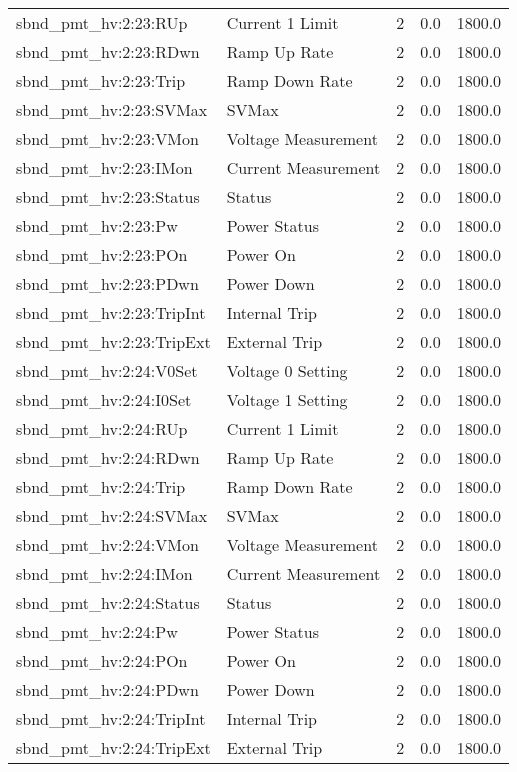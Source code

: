 \begin{center}
\begin{longtable}{l | l l l l }
sbnd\_pmt\_hv:2:23:RUp & Current 1 Limit & 2 & 0.0 & 1800.0\\ 
sbnd\_pmt\_hv:2:23:RDwn & Ramp Up Rate & 2 & 0.0 & 1800.0\\ 
sbnd\_pmt\_hv:2:23:Trip & Ramp Down Rate & 2 & 0.0 & 1800.0\\ 
sbnd\_pmt\_hv:2:23:SVMax & SVMax & 2 & 0.0 & 1800.0\\ 
sbnd\_pmt\_hv:2:23:VMon & Voltage Measurement & 2 & 0.0 & 1800.0\\ 
sbnd\_pmt\_hv:2:23:IMon & Current Measurement & 2 & 0.0 & 1800.0\\ 
sbnd\_pmt\_hv:2:23:Status & Status & 2 & 0.0 & 1800.0\\ 
sbnd\_pmt\_hv:2:23:Pw & Power Status & 2 & 0.0 & 1800.0\\ 
sbnd\_pmt\_hv:2:23:POn & Power On & 2 & 0.0 & 1800.0\\ 
sbnd\_pmt\_hv:2:23:PDwn & Power Down & 2 & 0.0 & 1800.0\\ 
sbnd\_pmt\_hv:2:23:TripInt & Internal Trip & 2 & 0.0 & 1800.0\\ 
sbnd\_pmt\_hv:2:23:TripExt & External Trip & 2 & 0.0 & 1800.0\\ 
sbnd\_pmt\_hv:2:24:V0Set & Voltage 0 Setting & 2 & 0.0 & 1800.0\\ 
sbnd\_pmt\_hv:2:24:I0Set & Voltage 1 Setting & 2 & 0.0 & 1800.0\\ 
sbnd\_pmt\_hv:2:24:RUp & Current 1 Limit & 2 & 0.0 & 1800.0\\ 
sbnd\_pmt\_hv:2:24:RDwn & Ramp Up Rate & 2 & 0.0 & 1800.0\\ 
sbnd\_pmt\_hv:2:24:Trip & Ramp Down Rate & 2 & 0.0 & 1800.0\\ 
sbnd\_pmt\_hv:2:24:SVMax & SVMax & 2 & 0.0 & 1800.0\\ 
sbnd\_pmt\_hv:2:24:VMon & Voltage Measurement & 2 & 0.0 & 1800.0\\ 
sbnd\_pmt\_hv:2:24:IMon & Current Measurement & 2 & 0.0 & 1800.0\\ 
sbnd\_pmt\_hv:2:24:Status & Status & 2 & 0.0 & 1800.0\\ 
sbnd\_pmt\_hv:2:24:Pw & Power Status & 2 & 0.0 & 1800.0\\ 
sbnd\_pmt\_hv:2:24:POn & Power On & 2 & 0.0 & 1800.0\\ 
sbnd\_pmt\_hv:2:24:PDwn & Power Down & 2 & 0.0 & 1800.0\\ 
sbnd\_pmt\_hv:2:24:TripInt & Internal Trip & 2 & 0.0 & 1800.0\\ 
sbnd\_pmt\_hv:2:24:TripExt & External Trip & 2 & 0.0 & 1800.0\\ 

\end{longtable}
\end{center}
